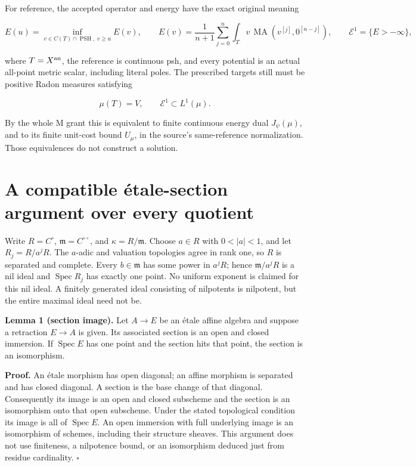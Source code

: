 \documentclass[
  11pt,
]{article}
\begin{document}
For reference, the accepted operator and energy have the exact original
meaning

\[
 E(u)=\inf_{v\in C(T)\cap\operatorname{PSH},\ v\geq u}E(v),\qquad
 E(v)=\frac1{n+1}\sum_{j=0}^n
       \int_Tv\,\operatorname{MA}(v^{[j]},0^{[n-j]}),
 \qquad \mathcal E^1=\{E>-\infty\},
\]

where \(T=X^{\rm an}\), the reference is continuous psh, and every
potential is an actual all-point metric scalar, including literal poles.
The prescribed targets still must be positive Radon measures satisfying

\[
 \mu(T)=V,\qquad \mathcal E^1\subset L^1(\mu).
\]

By the whole M grant this is equivalent to finite continuous energy dual
\(J_\psi(\mu)\), and to its finite unit-cost bound \(U_\mu\), in the
source's same-reference normalization. Those equivalences do not
construct a solution.

\section{A compatible étale-section argument over every
quotient}\label{a-compatible-uxe9tale-section-argument-over-every-quotient}

Write \(R=C^\circ\), \(\mathfrak m=C^{\circ\circ}\), and
\(\kappa=R/\mathfrak m\). Choose \(a\in R\) with \(0<|a|<1\), and let
\(R_j=R/a^jR\). The \(a\)-adic and valuation topologies agree in rank
one, so \(R\) is separated and complete. Every \(b\in\mathfrak m\) has
some power in \(a^jR\); hence \(\mathfrak m/a^jR\) is a nil ideal and
\(\operatorname{Spec}R_j\) has exactly one point. No uniform exponent is
claimed for this nil ideal. A finitely generated ideal consisting of
nilpotents is nilpotent, but the entire maximal ideal need not be.

\textbf{Lemma 1 (section image).} Let \(A\to E\) be an étale affine
algebra and suppose a retraction \(E\to A\) is given. Its associated
section is an open and closed immersion. If \(\operatorname{Spec}E\) has
one point and the section hits that point, the section is an
isomorphism.

\textbf{Proof.} An étale morphism has open diagonal; an affine morphism
is separated and has closed diagonal. A section is the base change of
that diagonal. Consequently its image is an open and closed subscheme
and the section is an isomorphism onto that open subscheme. Under the
stated topological condition its image is all of
\(\operatorname{Spec}E\). An open immersion with full underlying image
is an isomorphism of schemes, including their structure sheaves. This
argument does not use finiteness, a nilpotence bound, or an isomorphism
deduced just from residue cardinality. \(\square\)
\end{document}
